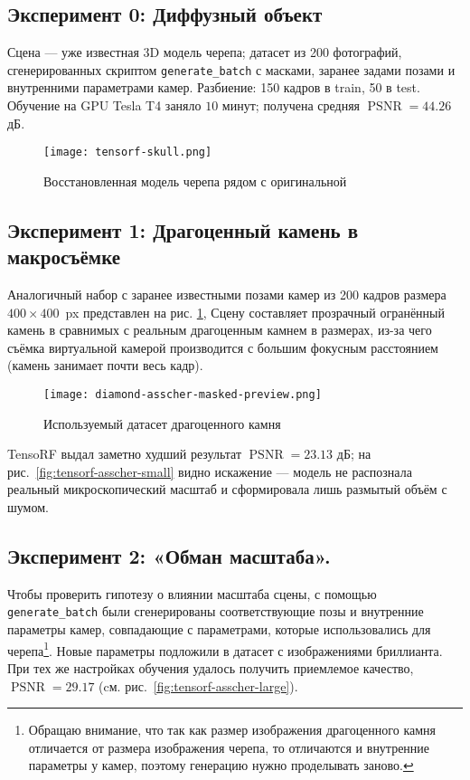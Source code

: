 \subsection{Эксперимент 0: Диффузный объект}
Сцена — уже известная 3D модель черепа; датасет из 200 фотографий, сгенерированных скриптом
\texttt{generate\_batch} с масками, заранее задами позами и внутренними
параметрами камер. Разбиение: 150 кадров в train, 50 в test.  Обучение на GPU
Tesla T4 заняло $10$ минут; получена средняя $\operatorname{PSNR} = 44.26$ дБ.

\begin{figure}[h]
  \centering
  \texttt{[image: tensorf-skull.png]}
  \caption{Восстановленная модель черепа рядом с оригинальной}
\end{figure}

\subsection{Эксперимент 1: Драгоценный камень в макросъёмке}
Аналогичный набор с заранее известными позами камер из 200 кадров размера
$400\times400$~px представлен на рис.  \ref{fig:asscher-preview}, Сцену
составляет прозрачный огранённый камень в сравнимых с реальным драгоценным
камнем в размерах, из-за чего съёмка виртуальной камерой производится с большим
фокусным расстоянием (камень занимает почти весь кадр).

\begin{figure}[h]
  \centering
  \texttt{[image: diamond-asscher-masked-preview.png]}
  \caption{Используемый датасет драгоценного камня}
	\label{fig:asscher-preview}
\end{figure}

TensoRF выдал заметно худший результат $\operatorname{PSNR}=23.13$ дБ; на
рис.~\ref{fig:tensorf-asscher-small} видно искажение — модель не распознала
реальный микроскопический масштаб и сформировала лишь размытый объём с шумом.

\subsection{Эксперимент 2: «Обман масштаба».}
Чтобы проверить гипотезу о влиянии масштаба сцены, с помощью
\texttt{generate\_batch} были сгенерированы соответствующие позы и внутренние
параметры камер, совпадающие с параметрами, которые использовались для
черепа\footnote{Обращаю внимание, что так как размер изображения драгоценного
камня отличается от размера изображения черепа, то отличаются и внутренние
параметры у камер, поэтому генерацию нужно проделывать заново.}.
Новые параметры подложили в датасет с изображениями бриллианта.
При тех же настройках обучения удалось получить приемлемое качество, $\operatorname{PSNR}=29.17$
(cм. рис.~\ref{fig:tensorf-asscher-large}).


